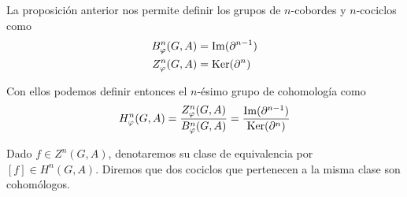 \begin{definicion}
	La proposición anterior nos permite definir los grupos de $n$-cobordes y $n$-cociclos como 
	\begin{align*}
		B^n_\varphi(G,A) &= \operatorname{Im}(\partial^{n-1}) \\
		Z^n_\varphi(G,A) &= \operatorname{Ker}(\partial^{n})
	\end{align*}
	
	Con ellos podemos definir entonces el $n$-ésimo grupo de cohomología como 
	\begin{equation}
		H^n_\varphi(G,A) = \frac{Z^n_\varphi(G,A)}{B^n_\varphi(G,A)} = \frac{\operatorname{Im}(\partial^{n-1})}{\operatorname{Ker}(\partial^{n})}
	\end{equation}
	
	Dado $f\in Z^n(G,A)$, denotaremos su clase de equivalencia por $[f]\in H^n(G,A)$. Diremos que dos cociclos que pertenecen a la misma clase son cohomólogos. 
\end{definicion}

